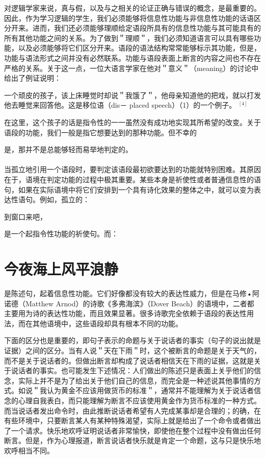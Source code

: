 对逻辑学家来说，真与假，以及与之相关的论证正确与错误的概念，是最重要的。因此，作为学习逻辑的学生，我们必须能够将信息性功能与非信息性功能的话语区分开来。进而，我们还必须能够理顺给定语段所具有的信息性功能与其可能具有的所有其他功能之间的关系。为了做到＂理顺＂，我们必须知道语言可以具有哪些功能，以及必须能够将它们区分开来。语段的语法结构常常能够标示其功能，但是，功能与语法形式之间并没有必然联系。功能与语段表面上断言的内容之间也不存在严格的关系。关于这一点，一位大语言学家在他对＂意义＂（meaning）的讨论中给出了例证说明：

\begin{displayquote}
一个顽皮的孩子，该上床睡觉时却说＂我饿了＂，他母亲知道他的把戏，就以打发他去睡觉来回答他。这是移位语（dis－ placed speech）（1）的一个例子。 ${ }^{[4]}$
\end{displayquote}

在这里，这个孩子的话是指令性的一一虽然没有成功地实现其所希望的改变。关于语段的功能，我们一般是指它想要达到的那种功能。但不幸的

是，那并不是总能够轻而易举地判定的。\\\\
当孤立地引用一个语段时，要判定该语段最初欲要达到的功能就特别困难。其原因在于，语境在判定功能的过程中极其重要。某些本身是祈使性或者普通信息性的语句，如果在实际语境中将它们安排到一个具有诗化效果的整体之中，就可以变为表达性语句。例如，孤立的：

到窗口来吧，

是一个起指令性功能的祈使句。而：

\section*{今夜海上风平浪静}
是陈述句，起着信息性功能。它们好像都没有较大的表达性威力，但是在马修•阿诺德（Matthew Arnod）的诗歌《多弗海滨》（Dover Beach）的语境中，二者都主要用为诗的表达性功能，而且效果显著。很多诗歌完全依赖于语段的表达性用法，而在其他语境中，这些语段却具有根本不同的功能。

下面的区分也是重要的，即句子表示的命题与关于说话者的事实（句子的说出就是证据）之间的区分。当有人说＂天在下雨＂时，这个被断言的命题是关于天气的，而不是关于说话者的。但做出断言却构成了说话者相信天在下雨的证据，这就是关于说话者的事实。也可能发生下述情况：人们做出的陈述只是表面上关乎他们的信念，实际上并不是为了给出关于他们自己的信息，而完全是一种述说其他事情的方式。如说＂我认为黄金不应该用做货币的标准＂，通常并不能理解为关于说话者信念的心理自我表白，而只能理解为断言不应该使用黄金作为货币标准的一种方式。而当说话者发出命令时，由此推断说话者希望有人完成某事却是合理的；的确，在有些环境中，只要断言某人有某种特殊渴望，实际上就是给出了一个命令或者做出了一个请求。快乐地欢呼证明说话者非常愉快，即使他在整个过程中没有做出任何断言。但是，作为心理报道，断言说话者快乐就是肯定一个命题，这与只是快乐地欢呼相当不同。


